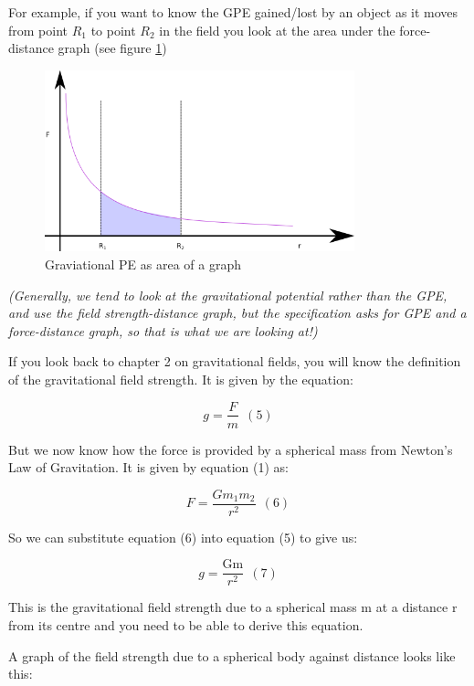 \documentclass[main.tex]{subfiles}
\begin{document}
For example, if you want to know the GPE gained/lost by an object as it
moves from point $R_1$ to point $R_2$ in the field you look at the area under
the force-distance graph (see figure \ref{gpe-area})

\begin{figure}
  \begin{center}
  \includegraphics[width=0.8\textwidth]{figs/chapt-13/area-energy.png}
\end{center}
  \caption{Graviational PE as area of a graph}
  \label{gpe-area}
\end{figure}


\emph{(Generally, we tend to look at the gravitational potential rather
than the GPE, and use the field strength-distance graph, but the
specification asks for GPE and a force-distance graph, so that is what
we are looking at!)}


If you look back to chapter 2 on gravitational fields, you will know the
definition of the gravitational field strength. It is given by the
equation:

\[g = \frac{F}{m}\ \ (5)\]

But we now know how the force is provided by a spherical mass from
Newton's Law of Gravitation. It is given by equation (1) as:

\[F = \frac{Gm_{1}m_{2}}{r^{2}}\ \ (6)\]

So we can substitute equation (6) into equation (5) to give us:

\[g = \frac{\text{Gm}}{r^{2}}\ \ (7)\]

This is the gravitational field strength due to a spherical mass m at a
distance r from its centre and you need to be able to derive this
equation.

A graph of the field strength due to a spherical body against distance
looks like this:
\end{document}
